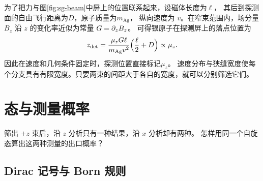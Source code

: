 为了把力与图\ref{fig:sg-beam}中屏上的位置联系起来，设磁体长度为$\ell$，
其后到探测面的自由飞行距离为$D$，原子质量为$m_\mathrm{Ag}$，
纵向速度为 $v$。在窄束范围内，场分量 $B_z$ 沿 $z$ 的变化率近似为常量 $G = \partial_z B_z$。
可得银原子在探测屏上的落点位置为
\begin{equation}
    z_{\mathrm{det}} = \frac{\mu_zG\ell}{m_\mathrm{Ag}v^2} \Bigl(\frac{\ell}{2} + D\Bigr) \propto \mu_z.
\end{equation}
因此在速度和几何条件固定时，探测位置直接标记$\mu_z$。
速度分布与狭缝宽度使每个分支具有有限宽度。只要两束的间距大于各自的宽度，就可以分别筛选它们。

\section{态与测量概率}
\label{sec:spin-amplitudes}

筛出 $+z$ 束后，沿 $z$ 分析只有一种结果，沿 $x$ 分析却有两种。
怎样用同一个自旋态算出这两种测量的出口概率？

\subsection{Dirac 记号与 Born 规则}
\label{ss:qm-amplitudes-born}

